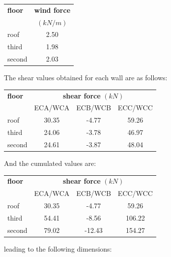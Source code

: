 \begin{center}
  \begin{tabular}{|l|c|}
    \hline
    \textbf{floor} & \textbf{wind force}\\
    & $(kN/m)$\\
    \hline
    roof & 2.50 \\
    third & 1.98 \\
    second & 2.03 \\
    \hline
  \end{tabular}
\end{center}  

\noindent The shear values obtained for each wall are as follows:

\begin{center}
  \begin{tabular}{|l|c|c|c|}
    \hline
    \textbf{floor} & \multicolumn{3}{|c|}{\textbf{shear force} $(kN)$}\\
                   & ECA/WCA & ECB/WCB & ECC/WCC \\
    \hline
    roof & 30.35 & -4.77 & 59.26 \\
    third & 24.06 & -3.78 & 46.97 \\
    second & 24.61 & -3.87 & 48.04 \\
    \hline
  \end{tabular}
\end{center}  

\noindent And the cumulated values are:

\begin{center}
  \begin{tabular}{|l|c|c|c|}
    \hline
    \textbf{floor} & \multicolumn{3}{|c|}{\textbf{shear force} $(kN)$}\\
                   & ECA/WCA & ECB/WCB & ECC/WCC \\
    \hline
roof & 30.35 & -4.77 & 59.26 \\
third & 54.41 & -8.56 & 106.22 \\
second & 79.02 & -12.43 & 154.27 \\
    \hline
  \end{tabular}
\end{center}

\noindent leading to the following dimensions:

